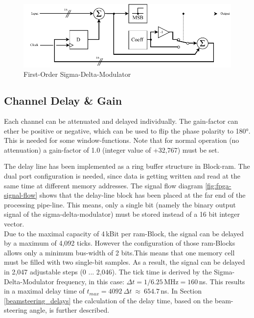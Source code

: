 \begin{figure}[h!]
    \centering
    \includegraphics[width=\textwidth]{images/4_Design/FPGA/Sigma-Delta-Modulator.pdf}
    \caption{First-Order Sigma-Delta-Modulator}
    \label{4_fig:fpga_Sigma-delta-modulator}
\end{figure}

\subsection{Channel Delay \& Gain}
Each channel can be attenuated and delayed individually. The gain-factor can ether be positive or negative, which can be used to flip the phase polarity to 180°. This is needed for some window-functions. Note that for normal operation (no attenuation) a gain-factor of 1.0 (integer value of +32,767) must be set.

The delay line has been implemented as a ring buffer structure in Block-\acrshort{ram}. The dual port configuration is needed, since data is getting written and read at the same time at different memory addresses. The signal flow diagram \ref{fig:fpga-signal-flow} shows that the delay-line block has been placed at the far end of the processing pipe-line. This means, only a single bit (namely the binary output signal of the sigma-delta-modulator) must be stored instead of a 16 bit integer vector.\\
Due to the maximal capacity of 4\,kBit per \acrshort{ram}-Block, the signal can be delayed by a maximum of 4,092 ticks. However the configuration of those \acrshort{ram}-Blocks allows only a minimum bus-width of 2 bits.This means that one memory cell must be filled with two single-bit samples. As a result, the signal can be delayed in 2,047 adjustable steps (0 ... 2,046). The tick time is derived by the Sigma-Delta-Modulator frequency, in this case: \mbox{$\Delta t = 1/6.25$\,MHz$ = 160$\,ns}. This results in a maximal delay time of \mbox{$t_{max} = 4092\ \Delta t \ \approx \ 654.7\,$ns}. In Section \ref{beamsteering_delays} the calculation of the delay time, based on the beam-steering angle, is further described.

